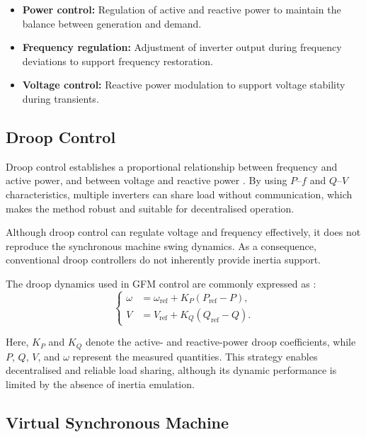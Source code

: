 \begin{itemize}
    \item \textbf{Power control:} Regulation of active and reactive power to maintain the balance between generation and demand.
    \item \textbf{Frequency regulation:} Adjustment of inverter output during frequency deviations to support frequency restoration.
    \item \textbf{Voltage control:} Reactive power modulation to support voltage stability during transients.
\end{itemize}


\subsection{Droop Control}

Droop control establishes a proportional relationship between frequency and active power, and between voltage and reactive power \cite{10620991}. By using \(P\text{--}f\) and \(Q\text{--}V\) characteristics, multiple inverters can share load without communication, which makes the method robust and suitable for decentralised operation.

Although droop control can regulate voltage and frequency effectively, it does not reproduce the synchronous machine swing dynamics. As a consequence, conventional droop controllers do not inherently provide inertia support.

The droop dynamics used in GFM control are commonly expressed as \cite{10949993}:
\begin{equation}
\left\{
\begin{aligned}
\omega &= \omega_{\text{ref}} + K_P (P_{\text{ref}} - P), \\
V &= V_{\text{ref}} + K_Q (Q_{\text{ref}} - Q).
\end{aligned}
\right.
\end{equation}

Here, \(K_P\) and \(K_Q\) denote the active- and reactive-power droop coefficients, while \(P\), \(Q\), \(V\), and \(\omega\) represent the measured quantities. This strategy enables decentralised and reliable load sharing, although its dynamic performance is limited by the absence of inertia emulation.

\subsection{Virtual Synchronous Machine}

